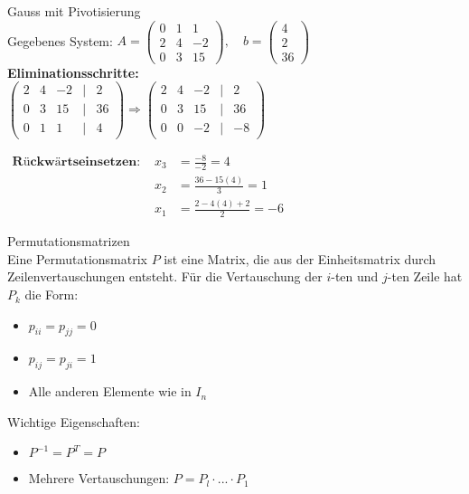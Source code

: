 \begin{example2}{Gauss mit Pivotisierung}
\vspace{-3mm}\\
Gegebenes System:
$A = \begin{pmatrix}
0 & 1 & 1\\
2 & 4 & -2\\
0 & 3 & 15
\end{pmatrix}, \quad b = \begin{pmatrix}
4\\
2\\
36
\end{pmatrix}$
\vspace{2mm}\\
\textbf{Eliminationsschritte: }
\vspace{2mm}\\
$\begin{pmatrix}
    2 & 4 & -2 & | & 2\\
    0 & 3 & 15 & | & 36\\
    0 & 1 & 1 & | & 4
    \end{pmatrix}
    \Rightarrow
    \begin{pmatrix}
    2 & 4 & -2 & | & 2\\
    0 & 3 & 15 & | & 36\\
    0 & 0 & -2 & | & -8
    \end{pmatrix}$

    \vspace{2mm}
$
\begin{array}{lrl}
    \textbf{Rückwärtseinsetzen: }& x_3 &= \frac{-8}{-2} = 4\\
    &x_2 &= \frac{36 - 15(4)}{3} = 1\\
    &x_1 &= \frac{2 - 4(4) + 2}{2} = -6
\end{array}
$
    
\end{example2}



\begin{concept}{Permutationsmatrizen}\\
Eine Permutationsmatrix $P$ ist eine Matrix, die aus der Einheitsmatrix durch Zeilenvertauschungen entsteht. Für die Vertauschung der $i$-ten und $j$-ten Zeile hat $P_k$ die Form:
\begin{itemize}
    \item $p_{ii} = p_{jj} = 0$ 
    \item $p_{ij} = p_{ji} = 1$
    \item Alle anderen Elemente wie in $I_n$
\end{itemize}
Wichtige Eigenschaften:
\begin{itemize}
    \item $P^{-1} = P^T = P$
    \item Mehrere Vertauschungen: $P = P_l \cdot ... \cdot P_1$
\end{itemize}
\end{concept}

